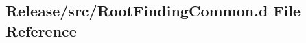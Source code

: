 \hypertarget{RootFindingCommon_8d}{
\subsection{Release/src/RootFindingCommon.d File Reference}
\label{RootFindingCommon_8d}
}
